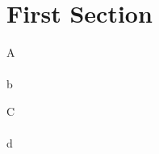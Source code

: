 \documentclass{article}
\begin{document}
\section{First Section}

\centerline{ A \\ \\ b }

C \\ \\ d
\end{document}
